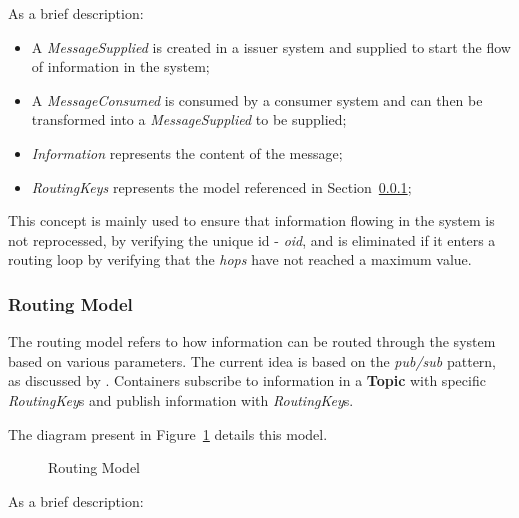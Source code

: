As a brief description:

\begin{itemize}
   \item A \textit{MessageSupplied} is created in a issuer system and supplied to start the flow of information in the system;
   \item A \textit{MessageConsumed} is consumed by a consumer system and can then be transformed into a \textit{MessageSupplied} to be supplied;
   \item \textit{Information} represents the content of the message;
   \item \textit{RoutingKeys} represents the model referenced in Section~\ref{subsubsec:design:domain:shared_model:routing};
\end{itemize}

This concept is mainly used to ensure that information flowing in the system is not reprocessed, by verifying the unique id - \textit{oid}, and is eliminated if it enters a routing loop by verifying that the \textit{hops} have not reached a maximum value.

\subsubsection{Routing Model}
\label{subsubsec:design:domain:shared_model:routing}

The routing model refers to how information can be routed through the system based on various parameters. The current idea is based on the \textit{pub/sub} pattern, as discussed by \cite{urquhart2021flow}. Containers subscribe to information in a \textbf{Topic} with specific \textit{RoutingKey}s and publish information with \textit{RoutingKey}s.

The diagram present in Figure~\ref{fig:design:domain:shared_model:routing:diagram} details this model.

\begin{figure}[H]
   \centering
  \resizebox{\columnwidth}{!}
  {
     
  }
  \caption[Routing Model]{Routing Model}
  \label{fig:design:domain:shared_model:routing:diagram}
\end{figure}

As a brief description:

